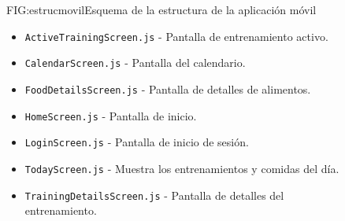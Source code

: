\begin{figure}[Estructura de aplicación móvil]{FIG:estrucmovil}{Esquema de la estructura de la aplicación móvil}
\begin{itemize}
\begin{itemize}
\begin{itemize}
                \item \texttt{ActiveTrainingScreen.js} - Pantalla de entrenamiento activo.
                \item \texttt{CalendarScreen.js} - Pantalla del calendario.
                \item \texttt{FoodDetailsScreen.js} - Pantalla de detalles de alimentos.
                \item \texttt{HomeScreen.js} - Pantalla de inicio.
                \item \texttt{LoginScreen.js} - Pantalla de inicio de sesión.
                \item \texttt{TodayScreen.js} - Muestra los entrenamientos y comidas del día.
                \item \texttt{TrainingDetailsScreen.js} - Pantalla de detalles del entrenamiento.
            \end{itemize}
        \end{itemize}
    \end{itemize}
\end{figure}